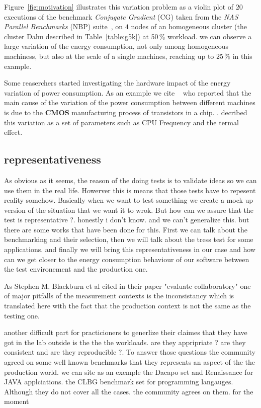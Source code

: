 Figure~\ref{fig:motivation} illustrates this variation problem as a violin plot of $20$ executions of the benchmark \emph{Conjugate Gradient} (\textsf{CG}) taken from the \emph{NAS Parallel Benchmarks} (NBP) suite~\cite{Bailey:1991:NPB:125826.125925}, on $4$ nodes of an homogeneous cluster (the cluster \textsf{Dahu} described in Table~\ref{table:g5k}) at 50\,\% workload.
we can observe a large variation of the energy consumption, not only among homogeneous machiness, but also at the scale of a single machines, reaching up to $25\,\%$ in this example.

Some reaserchers started investigating the hardware impact of the energy variation of power consumption. As an example we cite ~\cite{borkar_designing_2005,tschanz_adaptive_2002} who reported that the main cause of the variation of the power consumption between different machines is due to the \textbf{CMOS} manufacturing process of transistors in a chip.
\cite{heinrich_predicting}. decribed this variation as a set of parameters such as CPU Frequency and the termal effect.


\subsection{representativeness}
As obvious as it seems, the reason of the doing tests is to validate ideas so we can use them in the real life. Howerver this is means that those tests have to repesent reality somehow.
Basically when we want to test something we create a mock up version of the situation that we want it to wrok. But how can we assure that the test is representative ?. honestly i don't know. and we can't generalize this. but there are some works that have been done for this.
First we can talk about the benchmarking and their selection, then we will talk about the tress test for some applications. and finally we will bring this representativeness in our case and how can we get closer to the energy consumption behaviour of our software between the test environement and the production one.

As Stephen M. Blackburn et al cited in their paper "evaluate collaboratory" \cite{stephen_evaluate_2012} one of major pitfalls of the measurement contexts is the inconsistancy which is translated here with the fact that the production context is not the same as the testing one.

another difficult part for practicioners to generlize their claimes that they have got in the lab outside is the the the workloads. are they appripriate ? are they consistent and are they reproducible ?. To answer those questions the community agreed on some well known benchmarks that they represents an aspect of the the production world. we can site as an exemple the Dacapo set and Renaissance for JAVA applciations. the CLBG benchmark set for programming langauges.
Although they  do not cover all the cases. the community agrees on them. for the moment

